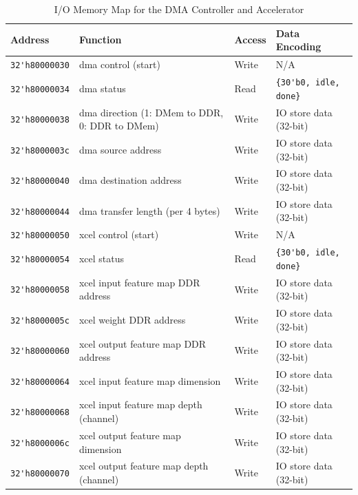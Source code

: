 \documentclass[11pt]{article}
\begin{document}
\begin{table}[hbt]
  \begin{center}
    \caption{I/O Memory Map for the DMA Controller and Accelerator}
    \label{mem_map_conv2D}
    \begin{adjustbox}{width=\columnwidth,center}
    \begin{tabular}{l l l l}
      \toprule
      \textbf{Address} & \textbf{Function} & \textbf{Access} & \textbf{Data Encoding}\\
      \midrule
      \verb|32'h80000030| & dma control (start) & Write & N/A \\
      \verb|32'h80000034| & dma status & Read & \verb|{30'b0, idle, done}| \\
      \verb|32'h80000038| & dma direction (1: DMem to DDR, 0: DDR to DMem) & Write & IO store data (32-bit) \\
      \verb|32'h8000003c| & dma source address & Write & IO store data (32-bit) \\
      \verb|32'h80000040| & dma destination address & Write & IO store data (32-bit) \\
      \verb|32'h80000044| & dma transfer length (per 4 bytes) & Write & IO store data (32-bit) \\
      \verb|32'h80000050| & xcel control (start) & Write & N/A \\
      \verb|32'h80000054| & xcel status & Read & \verb|{30'b0, idle, done}| \\
      \verb|32'h80000058| & xcel input feature map DDR address & Write & IO store data (32-bit) \\
      \verb|32'h8000005c| & xcel weight DDR address & Write & IO store data (32-bit) \\
      \verb|32'h80000060| & xcel output feature map DDR address & Write & IO store data (32-bit) \\
      \verb|32'h80000064| & xcel input feature map dimension & Write & IO store data (32-bit) \\
      \verb|32'h80000068| & xcel input feature map depth (channel) & Write & IO store data (32-bit) \\
      \verb|32'h8000006c| & xcel output feature map dimension & Write & IO store data (32-bit) \\
      \verb|32'h80000070| & xcel output feature map depth (channel) & Write & IO store data (32-bit) \\
      \bottomrule
    \end{tabular}
    \end{adjustbox}
  \end{center}
\end{table}
\end{document}
